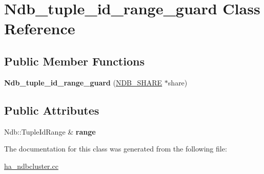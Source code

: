 \hypertarget{classNdb__tuple__id__range__guard}{}\section{Ndb\+\_\+tuple\+\_\+id\+\_\+range\+\_\+guard Class Reference}
\label{classNdb__tuple__id__range__guard}
\subsection*{Public Member Functions}
\begin{DoxyCompactItemize}
\item 
\mbox{\label{classNdb__tuple__id__range__guard_a5e584dc3eadf6d670c0e0a395ddac934}} 
{\bfseries Ndb\+\_\+tuple\+\_\+id\+\_\+range\+\_\+guard} (\mbox{\hyperlink{structNDB__SHARE}{N\+D\+B\+\_\+\+S\+H\+A\+RE}} $\ast$share)
\end{DoxyCompactItemize}
\subsection*{Public Attributes}
\begin{DoxyCompactItemize}
\item 
\mbox{\label{classNdb__tuple__id__range__guard_afca325ebe32926c792186730561127e5}} 
Ndb\+::\+Tuple\+Id\+Range \& {\bfseries range}
\end{DoxyCompactItemize}


The documentation for this class was generated from the following file\+:\begin{DoxyCompactItemize}
\item 
\mbox{\hyperlink{ha__ndbcluster_8cc}{ha\+\_\+ndbcluster.\+cc}}\end{DoxyCompactItemize}
